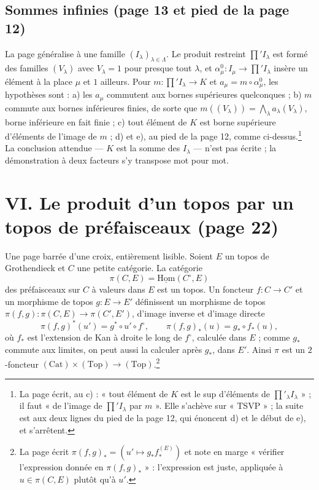 \documentclass[11pt,a4paper]{article}
\begin{document}
\subsection*{Sommes infinies (page 13 et pied de la page 12)}

La page généralise à une famille $(I_\lambda)_{\lambda \in \Lambda}$. Le
produit restreint $\prod' I_\lambda$ est formé des familles $(V_\lambda)$ avec
$V_\lambda = 1$ pour presque tout $\lambda$, et
$\alpha^{0}_\mu : I_\mu \to \prod' I_\lambda$ insère un élément à la place
$\mu$ et $1$ ailleurs. Pour $m : \prod' I_\lambda \to K$ et
$a_\mu = m \circ \alpha^{0}_\mu$, les hypothèses sont : a) les $a_\mu$
commutent aux bornes supérieures quelconques ; b) $m$ commute aux bornes
inférieures finies, de sorte que $m((V_\lambda)) = \bigwedge_\lambda a_\lambda(V_\lambda)$,
borne inférieure en fait finie ; c) tout élément de $K$ est borne supérieure
d'éléments de l'image de $m$ ; d) et e), au pied de la page 12, comme
ci-dessus.\footnote{La page écrit, au c) : « tout élément de $K$ est le sup
d'éléments de $\prod'_\lambda I_\lambda$ » ; il faut « de l'image de
$\prod' I_\lambda$ par $m$ ». Elle s'achève sur « TSVP » ; la suite est aux
deux lignes du pied de la page 12, qui énoncent d) et le début de e), et
s'arrêtent.} La conclusion attendue --- $K$ est la somme des $I_\lambda$ ---
n'est pas écrite ; la démonstration à deux facteurs s'y transpose mot pour
mot.

\section*{VI. Le produit d'un topos par un topos de préfaisceaux (page 22)}

Une page barrée d'une croix, entièrement lisible. Soient $E$ un topos de
Grothendieck et $C$ une petite catégorie. La catégorie
\[
\pi(C, E) = \underline{\mathrm{Hom}}(C^{\circ}, E)
\]
des préfaisceaux sur $C$ à valeurs dans $E$ est un topos. Un foncteur
$f : C \to C'$ et un morphisme de topos $g : E \to E'$ définissent un
morphisme de topos $\pi(f, g) : \pi(C, E) \to \pi(C', E')$, d'image inverse
et d'image directe
\[
\pi(f,g)^{*}(u') = g^{*} \circ u' \circ f^{\circ},
\qquad
\pi(f,g)_{*}(u) = g_{*} \circ f_{*}(u),
\]
où $f_{*}$ est l'extension de Kan à droite le long de $f^{\circ}$, calculée
dans $E$ ; comme $g_{*}$ commute aux limites, on peut aussi la calculer après
$g_{*}$, dans $E'$. Ainsi $\pi$ est un $2$-foncteur
$(\mathrm{Cat}) \times (\mathrm{Top}) \to (\mathrm{Top})$.\footnote{La page
écrit $\pi(f,g)_{*} = (u' \mapsto g_{*} f_{*}^{(E)})$ et note en marge
« vérifier l'expression donnée en $\pi(f,g)_{*}$ » : l'expression est juste,
appliquée à $u \in \pi(C, E)$ plutôt qu'à $u'$.}
\end{document}
